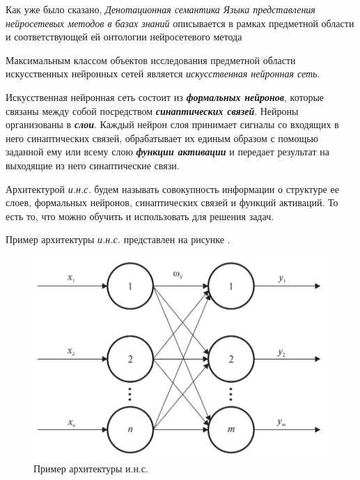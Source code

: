 Как уже было сказано, \textit{Денотационная семантика Языка представления нейросетевых методов в базах знаний} описывается в рамках предметной области и соответствующей ей онтологии нейросетевого метода

Максимальным классом объектов исследования предметной области искусственных нейронных сетей является \textit{искусственная нейронная сеть}.

\begin{SCn}
\end{SCn}

Искусственная нейронная сеть состоит из \textbf{\textit{формальных нейронов}}, которые связаны между собой посредством \textbf{\textit{синаптических связей}}. Нейроны организованы в \textbf{\textit{слои}}. Каждый нейрон слоя принимает сигналы со входящих в него синаптических связей, обрабатывает их единым образом с помощью заданной ему или всему слою \textbf{\textit{функции активации}} и передает результат на выходящие из него синаптические связи.

Архитектурой \textit{и.н.с.} будем называть совокупность информации о структуре ее слоев, формальных нейронов, синаптических связей и функций активаций. То есть то, что можно обучить и использовать для решения задач.

Пример архитектуры \textit{и.н.с.} представлен на рисунке \textit{}.

\begin{figure}[H]
	\centering
	\includegraphics[scale=0.3]{author/part3/figures/neural_network.png}
	\caption{Пример архитектуры и.н.с.}
	\label{fig:nn_example}
\end{figure}

